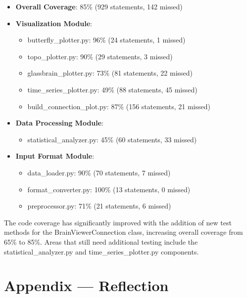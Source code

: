 \documentclass[12pt, titlepage]{article}
\begin{document}
\begin{itemize}
    \item \textbf{Overall Coverage}: 85\% (929 statements, 142 missed)
    
    \item \textbf{Visualization Module}:
    \begin{itemize}
        \item butterfly\_plotter.py: 96\% (24 statements, 1 missed)
        \item topo\_plotter.py: 90\% (29 statements, 3 missed)
        \item glassbrain\_plotter.py: 73\% (81 statements, 22 missed)
        \item time\_series\_plotter.py: 49\% (88 statements, 45 missed)
        \item build\_connection\_plot.py: 87\% (156 statements, 21 missed)
    \end{itemize}
    
    \item \textbf{Data Processing Module}:
    \begin{itemize}
        \item statistical\_analyzer.py: 45\% (60 statements, 33 missed)
    \end{itemize}
    
    \item \textbf{Input Format Module}:
    \begin{itemize}
        \item data\_loader.py: 90\% (70 statements, 7 missed)
        \item format\_converter.py: 100\% (13 statements, 0 missed)
        \item preprocessor.py: 71\% (21 statements, 6 missed)
    \end{itemize}
\end{itemize}

The code coverage has significantly improved with the addition of new test methods for the BrainViewerConnection class, increasing overall coverage from 65\% to 85\%. Areas that still need additional testing include the statistical\_analyzer.py and time\_series\_plotter.py components.




\newpage{}
\section*{Appendix --- Reflection}
\end{document}
